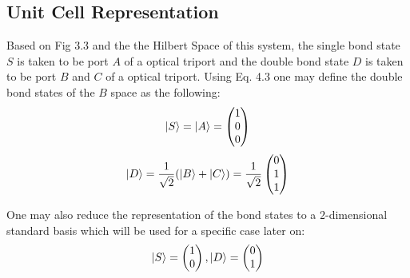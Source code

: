 \subsection{Unit Cell Representation}
Based on Fig 3.3 and the the Hilbert Space of this system, the single bond state $S$ is taken to be port $A$ of a optical triport and the double bond state $D$ is taken to be port $B$ and $C$ of a optical triport. Using Eq. 4.3 one may define the double bond states of the $B$ space as the following:
\begin{equation}
    \ket{S} = \ket{A} = \begin{pmatrix}
    1 \\ 0 \\ 0 \end{pmatrix}
\end{equation}
\begin{equation}
    \ket{D} = \frac{1}{\sqrt{2}}(\ket{B}+\ket{C}) = \frac{1}{\sqrt{2}}
    \begin{pmatrix}
    0 \\ 1 \\ 1 \end{pmatrix}
\end{equation}

One may also reduce the representation of the bond states to a $2$-dimensional standard basis which will be used for a specific case later on:
\begin{equation}
    \ket{S} = \begin{pmatrix} 1 \\ 0 \end{pmatrix},
    \ket{D} = \begin{pmatrix} 0 \\ 1 \end{pmatrix}
\end{equation}


